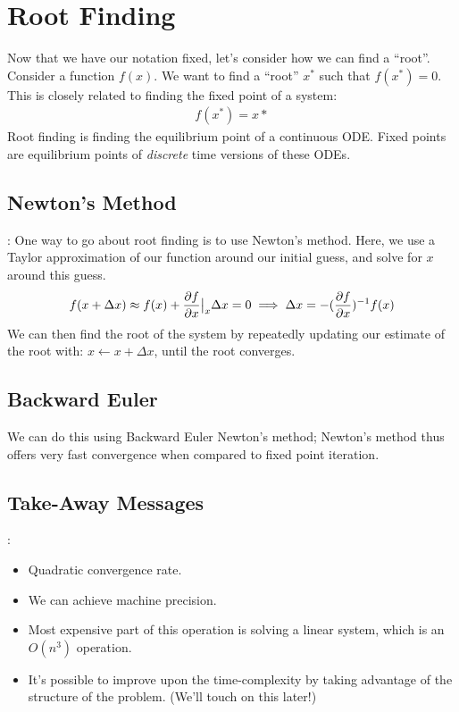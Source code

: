 \section{Root Finding}
Now that we have our notation fixed, let's consider how we can find a ``root''. Consider a function $f(x)$. We want to find a ``root'' $x^*$ such that $f(x^*)=0$. This is closely related to finding the fixed point of a system: 
\begin{align}
    f(x^*) = x*
\end{align}
Root finding is finding the equilibrium point of a continuous ODE. Fixed points are equilibrium points of \textit{discrete} time versions of these ODEs. 

\subsection{Newton's Method}:
One way to go about root finding is to use Newton's method. Here, we use a Taylor approximation of our function around our initial guess, and solve for $x$ around this guess. 
\begin{align}
    f(x + \Delta x) \approx f(x) + \evalat{\frac{\partial f}{\partial x}}{x} \Delta x = 0
    \implies \Delta x = - (\frac{\partial f}{\partial x})^{-1} f(x) 
\end{align}
We can then find the root of the system by repeatedly updating our estimate of the root with: $x \gets x + \Delta x$, until the root converges. 

\subsection{Backward Euler}
We can do this using Backward Euler Newton's method; Newton's method thus offers very fast convergence when compared to fixed point iteration. 

\subsection{Take-Away Messages}:
\begin{itemize}
    \item Quadratic convergence rate. 
    \item We can achieve machine precision. 
    \item Most expensive part of this operation is solving a linear system, which is an $O(n^3)$ operation.
    \item It's possible to improve upon the time-complexity by taking advantage of the structure of the problem. (We'll touch on this later!) 
\end{itemize}

